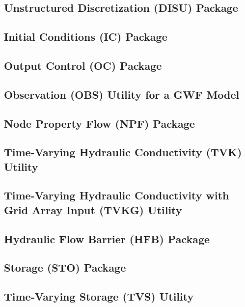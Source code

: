 \newpage
\subsection{Unstructured Discretization (DISU) Package}


\newpage
\subsection{Initial Conditions (IC) Package}


\newpage
\subsection{Output Control (OC) Package}


\newpage
\subsection{Observation (OBS) Utility for a GWF Model}


\newpage
\subsection{Node Property Flow (NPF) Package}


\newpage
\subsection{Time-Varying Hydraulic Conductivity (TVK) Utility}


\newpage
\subsection{Time-Varying Hydraulic Conductivity with Grid Array Input (TVKG) Utility}


\newpage
\subsection{Hydraulic Flow Barrier (HFB) Package}


\newpage
\subsection{Storage (STO) Package}


\newpage
\subsection{Time-Varying Storage (TVS) Utility}


